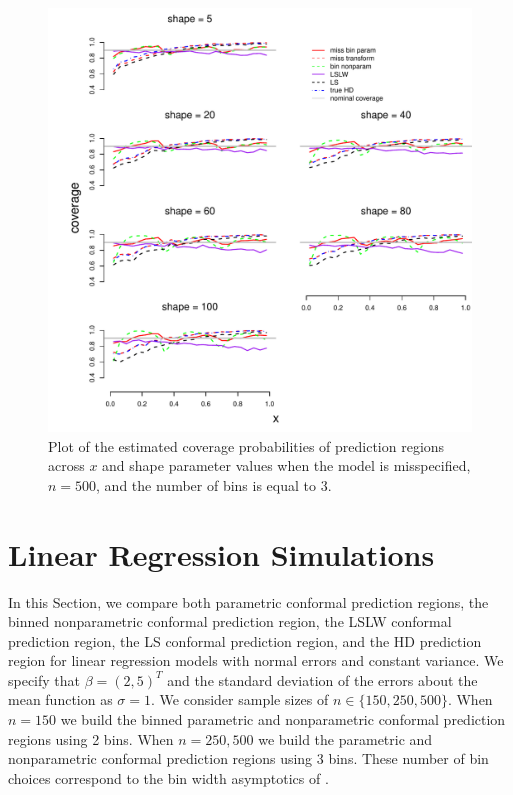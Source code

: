 \documentclass[11pt]{article}\usepackage[]{graphicx}\usepackage[]{color}
\makeatletter
\def\maxwidth{ %
  \ifdim\Gin@nat@width>\linewidth
    \linewidth
  \else
    \Gin@nat@width
  \fi
}
\newenvironment{knitrout}{}{} %
\makeatother
\begin{document}
\newpage
\begin{figure}[h!]
\begin{center}
\begin{knitrout}
\color{fgcolor}
\includegraphics[width=\maxwidth]{figure/Fig-misspec-inx-500-1} 

\end{knitrout}
\end{center}
\caption{Plot of the estimated coverage probabilities of prediction regions 
  across $x$ and shape parameter values when the model is misspecified, 
  $n = 500$, and the number of bins is equal to $3$.}
\label{Fig:misspec.inx.500}
\end{figure}





\newpage
\section{Linear Regression Simulations}
\label{sec:regression}

In this Section, we compare both parametric conformal prediction 
regions, the binned nonparametric conformal prediction region, the LSLW conformal 
prediction region, the LS conformal prediction region, and the HD prediction 
region for linear regression models with normal errors and constant variance.  
We specify that $\beta = (2, 5)^T$ and the standard deviation of the errors 
about the mean function as $\sigma = 1$.
We consider sample sizes of $n \in \{150, 250, 500\}$. 
When $n = 150$ we build the binned parametric and nonparametric conformal 
prediction regions using 2 bins.  When $n = 250, 500$ we build the parametric 
and nonparametric conformal prediction regions using 3 bins.  These number of 
bin choices correspond to the bin width asymptotics of 
\citet{lei2014distribution}. 
\end{document}
